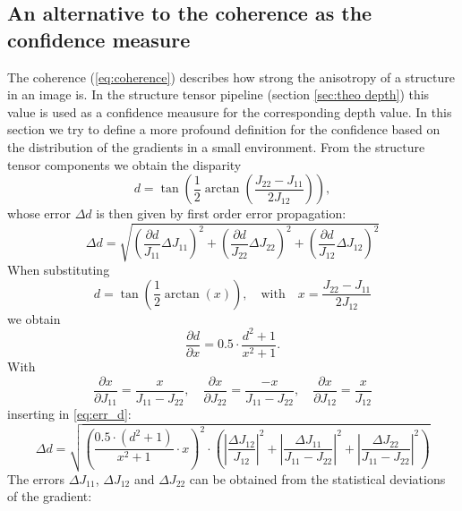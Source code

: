 \documentclass  [
  paper    = a4,
  BCOR     = 10mm,
  twoside,
  fontsize = 12pt,
  fleqn,
  toc      = bibnumbered,
  toc      = listofnumbered,
  numbers  = noendperiod,
  headings = normal,
  listof   = leveldown,
  version  = 3.03
]                                       {scrreprt}
\begin{document}
 \subsection{An alternative to the coherence as the confidence measure}
 The coherence (\ref{eq:coherence}) describes how strong the anisotropy of a structure in an image is. In the structure tensor pipeline (section \ref{sec:theo depth}) this value is used as a confidence meausure for the corresponding depth value. In this section we try to define a more profound definition for the confidence based on the distribution of the gradients in a small environment.
 From the structure tensor components we obtain the disparity 
 \begin{equation}\label{eq:disparity2}
 d = \tan\left(\frac{1}{2} \arctan\left( \frac{J_{22}-J_{11}}{2J_{12}}\right)\right),
 \end{equation}
 whose error $\Delta d$ is then given by first order error propagation:
 \begin{equation}\label{eq:err_d}
 \Delta d = \sqrt{\left(\frac{\partial d}{J_{11}}  \Delta J_{11}\right)^2 + \left(\frac{\partial d}{J_{22}}  \Delta J_{22}\right)^2 + \left(\frac{\partial d}{J_{12}} \Delta J_{12}\right)^2 }
 \end{equation}
 When substituting
 \begin{equation}\label{eq:disparity2}
 d = \tan\left(\frac{1}{2} \arctan\left( x\right)\right),\quad \text{with}\quad  x = \frac{J_{22}-J_{11}}{2J_{12}}
 \end{equation}
 we obtain
 \begin{equation}\label{key}
 \frac{\partial d}{\partial x} = 0.5\cdot \frac{d^2+1}{x^2+1}.
 \end{equation}
 With
 \begin{equation}\label{key}
 \frac{\partial x}{\partial J_{11}} = \frac{x}{J_{11} - J_{22}},\quad \frac{\partial x}{\partial J_{22}} = \frac{-x}{J_{11} - J_{22}},\quad  \frac{\partial x}{\partial J_{12}} = \frac{x}{J_{12}}
 \end{equation}
 inserting in \ref{eq:err_d}:
 \begin{equation}\label{eq:deviation_d}
 \Delta d =\sqrt{\left(\frac{0.5\cdot(d^2+1)}{x^2+1}\cdot x\right)^2 \cdot \left(\left|\frac{\Delta J_{12}}{J_{12}}\right|^2 + \left|\frac{\Delta J_{11}}{J_{11}-J_{22}}\right|^2 + \left|\frac{\Delta J_{22}}{J_{11}-J_{22}}\right|^2\right)}
 \end{equation}
 The errors $\Delta J_{11}$, $\Delta J_{12}$ and $\Delta J_{22}$ can be obtained from the statistical deviations of the gradient:
\end{document}
